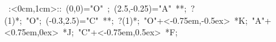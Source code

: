 
\hbox{
\xy    <1cm,0cm>:<0cm,1cm>::
       (0,0)="O" ; (2.5,-0.25)="A" **\dir{-};  ?(1)*\dir{>};
       "O"; (-0.3,2.5)="C" **\dir{-};  ?(1)*\dir{>};
       "O"+<-0.75em,-0.5ex> *{K};
       "A"+<0.75em,0ex> *{J};
       "C"+<-0.75em,0.5ex> *{F};
       \endxy}
	   
